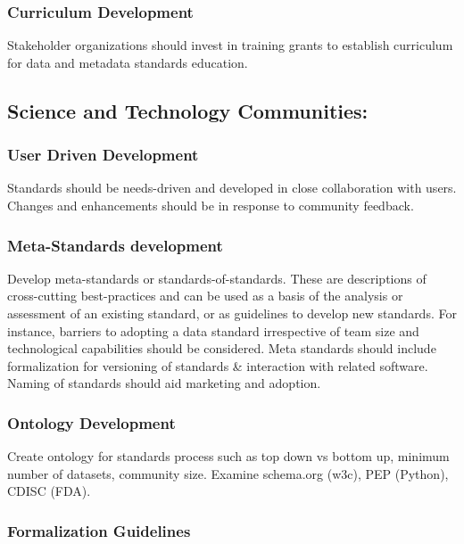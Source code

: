 \documentclass[
  letterpaper,
  DIV=11,
  numbers=noendperiod]{scrartcl}
\begin{document}
\subsubsection{Curriculum Development}\label{curriculum-development}

Stakeholder organizations should invest in training grants to establish
curriculum for data and metadata standards education.

\subsection{Science and Technology
Communities:}\label{science-and-technology-communities}

\subsubsection{User Driven Development}\label{user-driven-development}

Standards should be needs-driven and developed in close collaboration
with users. Changes and enhancements should be in response to community
feedback.

\subsubsection{Meta-Standards
development}\label{meta-standards-development}

Develop meta-standards or standards-of-standards. These are descriptions
of cross-cutting best-practices and can be used as a basis of the
analysis or assessment of an existing standard, or as guidelines to
develop new standards. For instance, barriers to adopting a data
standard irrespective of team size and technological capabilities should
be considered. Meta standards should include formalization for
versioning of standards \& interaction with related software. Naming of
standards should aid marketing and adoption.

\subsubsection{Ontology Development}\label{ontology-development}

Create ontology for standards process such as top down vs bottom up,
minimum number of datasets, community size. Examine schema.org (w3c),
PEP (Python), CDISC (FDA).

\subsubsection{Formalization Guidelines}\label{formalization-guidelines}
\end{document}
